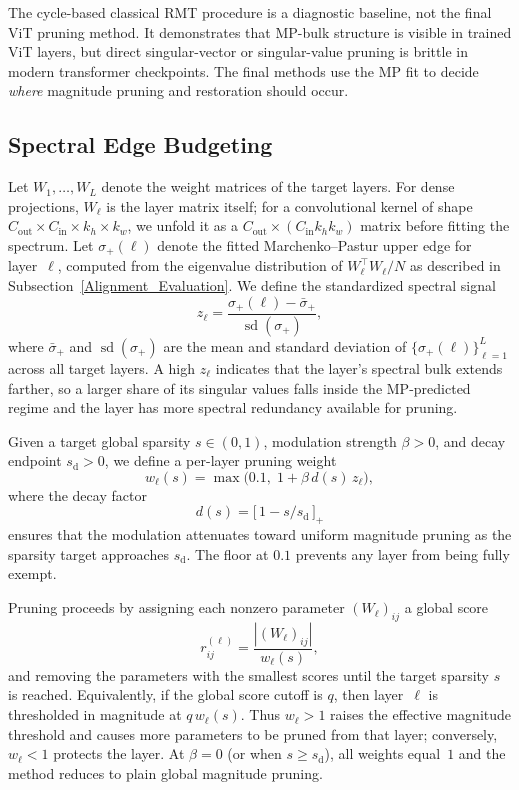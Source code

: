 \documentclass[11pt]{article}
\theoremstyle{plain}
\theoremstyle{definition}
\theoremstyle{remark}
\newcommand{\1}{\mathbf{1}}
\begin{document}
The cycle-based classical RMT procedure is a diagnostic baseline, not the final ViT pruning method.  It demonstrates that MP-bulk structure is visible in trained ViT layers, but direct singular-vector or singular-value pruning is brittle in modern transformer checkpoints.  The final methods use the MP fit to decide \emph{where} magnitude pruning and restoration should occur.

\subsection{Spectral Edge Budgeting}
\label{subsec:splus_method}

Let \(W_1,\dots,W_L\) denote the weight matrices of the target layers.  For dense projections, \(W_\ell\) is the layer matrix itself; for a convolutional kernel of shape \(C_{\mathrm{out}}\times C_{\mathrm{in}}\times k_h\times k_w\), we unfold it as a \(C_{\mathrm{out}}\times(C_{\mathrm{in}}k_hk_w)\) matrix before fitting the spectrum.  Let \(\sigma_+(\ell)\) denote the fitted Marchenko--Pastur upper edge for layer~\(\ell\), computed from the eigenvalue distribution of \(W_\ell^\top W_\ell / N\) as described in Subsection~\ref{Alignment_Evaluation}.  We define the standardized spectral signal
\[
z_\ell = \frac{\sigma_+(\ell) - \bar{\sigma}_+}{\operatorname{sd}(\sigma_+)},
\]
where \(\bar{\sigma}_+\) and \(\operatorname{sd}(\sigma_+)\) are the mean and standard deviation of \(\{\sigma_+(\ell)\}_{\ell=1}^L\) across all target layers.  A high \(z_\ell\) indicates that the layer's spectral bulk extends farther, so a larger share of its singular values falls inside the MP-predicted regime and the layer has more spectral redundancy available for pruning.

Given a target global sparsity \(s\in(0,1)\), modulation strength \(\beta>0\), and decay endpoint \(s_{\mathrm{d}}>0\), we define a per-layer pruning weight
\begin{equation}
\label{eq:splus_weight}
w_\ell(s) = \max\!\Big(0.1,\; 1 + \beta\,d(s)\,z_\ell\Big),
\end{equation}
where the decay factor
\begin{equation}
\label{eq:decay}
d(s) = \bigl[\,1 - s/s_{\mathrm{d}}\,\bigr]_+
\end{equation}
ensures that the modulation attenuates toward uniform magnitude pruning as the sparsity target approaches \(s_{\mathrm{d}}\).  The floor at \(0.1\) prevents any layer from being fully exempt.

Pruning proceeds by assigning each nonzero parameter \((W_\ell)_{ij}\) a global score
\[
r_{ij}^{(\ell)} = \frac{|(W_\ell)_{ij}|}{w_\ell(s)},
\]
and removing the parameters with the smallest scores until the target sparsity \(s\) is reached.  Equivalently, if the global score cutoff is \(q\), then layer~\(\ell\) is thresholded in magnitude at \(q\,w_\ell(s)\). Thus \(w_\ell>1\) raises the effective magnitude threshold and causes more parameters to be pruned from that layer; conversely, \(w_\ell<1\) protects the layer.  At \(\beta=0\) (or when \(s\ge s_{\mathrm{d}}\)), all weights equal~\(1\) and the method reduces to plain global magnitude pruning.
\end{document}
